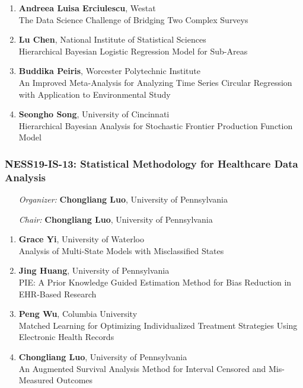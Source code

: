 \begin{enumerate}
\item \textbf{Andreea Luisa Erciulescu}, Westat \\
The Data Science Challenge of Bridging Two Complex Surveys
\item \textbf{Lu Chen}, National Institute of Statistical Sciences \\
Hierarchical Bayesian Logistic Regression Model for Sub-Areas
\item \textbf{Buddika Peiris}, Worcester Polytechnic Institute \\
An Improved Meta-Analysis for Analyzing Time Series Circular Regression with Application to Environmental Study
\item \textbf{Seongho Song}, University of Cincinnati \\
Hierarchical Bayesian Analysis for Stochastic Frontier Production Function Model
\end{enumerate}

\subsubsection*{NESS19-IS-13: Statistical Methodology for Healthcare Data Analysis}

\begin{enumerate}[align=left]
\item [\emph{Organizer:}] \textbf{Chongliang Luo}, University of Pennsylvania
\item [\emph{Chair:}] \textbf{Chongliang Luo}, University of Pennsylvania
\end{enumerate}

\begin{enumerate}
\item \textbf{Grace Yi}, University of Waterloo \\
Analysis of Multi-State Models with Misclassified States
\item \textbf{Jing Huang}, University of Pennsylvania \\
PIE: A Prior Knowledge Guided Estimation Method for Bias Reduction in EHR-Based Research
\item \textbf{Peng Wu}, Columbia University \\
Matched Learning for Optimizing Individualized Treatment Strategies Using Electronic Health Records
\item \textbf{Chongliang Luo}, University of Pennsylvania \\
An Augmented Survival Analysis Method for Interval Censored and Mis-Measured Outcomes
\end{enumerate}

